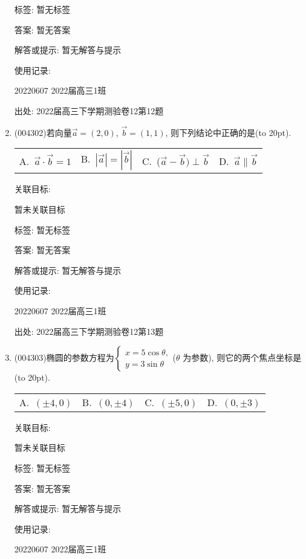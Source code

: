 \documentclass[10pt,a4paper]{article}
\newcommand{\bracket}[1]{(\hbox to #1pt{})}
\newcommand{\fourch}[4]{\par\begin{tabular}{p{.23\textwidth}p{.23\textwidth}p{.23\textwidth}p{.23\textwidth}}
A.~#1 &B.~#2& C.~#3& D.~#4
\end{tabular}}
\begin{document}
\begin{enumerate}[1.]
标签: 暂无标签

答案: 暂无答案

解答或提示: 暂无解答与提示

使用记录:

20220607	2022届高三1班	


出处: 2022届高三下学期测验卷12第12题
\item { (004302)}若向量$\overrightarrow a=(2,0)$, $\overrightarrow b=(1,1)$, 则下列结论中正确的是\bracket{20}.
\fourch{$\overrightarrow a\cdot \overrightarrow b=1$}{$|\overrightarrow a|=|\overrightarrow b|$}{($\overrightarrow a-\overrightarrow b)\perp \overrightarrow b$}{$\overrightarrow a\parallel \overrightarrow b$}


关联目标:

暂未关联目标



标签: 暂无标签

答案: 暂无答案

解答或提示: 暂无解答与提示

使用记录:

20220607	2022届高三1班	


出处: 2022届高三下学期测验卷12第13题
\item { (004303)}椭圆的参数方程为$\begin{cases} x=5\cos \theta,  \\ y=3\sin \theta  \end{cases}$($\theta$ 为参数), 则它的两个焦点坐标是\bracket{20}.
\fourch{$(\pm 4,0)$}{$(0,\pm 4)$}{$(\pm 5,0)$}{$(0,\pm 3)$}


关联目标:

暂未关联目标



标签: 暂无标签

答案: 暂无答案

解答或提示: 暂无解答与提示

使用记录:

20220607	2022届高三1班	



\end{enumerate}
\end{document}
